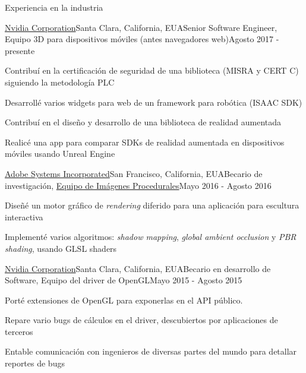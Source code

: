 \documentclass{resume} %
\begin{document}

\begin{rSection}{Experiencia en la industria}

\begin{rSubsection}{\href{http://www.nvidia.com}{Nvidia Corporation}}{Santa Clara, California, EUA}{Senior Software Engineer, Equipo 3D para dispositivos móviles (antes navegadores web)}{Agosto 2017 - presente}
\item Contribuí en la certificación de seguridad de una biblioteca (MISRA y CERT C) siguiendo la metodología PLC
\item Desarrollé varios widgets para web de un framework para robótica (ISAAC SDK)
\item Contribuí en el diseño y desarrollo de una biblioteca de realidad aumentada
\item Realicé una app para comparar SDKs de realidad aumentada en dispositivos móviles usando Unreal Engine
\end{rSubsection}

\begin{rSubsection}{\href{http://www.adobe.com/}{Adobe Systems Incorporated}}{San Francisco, California, EUA}{Becario de investigación, \href{http://research.adobe.com/}{Equipo de Imágenes Procedurales}}{Mayo 2016 - Agosto 2016}
\item Diseñé un motor gráfico de \emph{rendering} diferido para una aplicación para escultura interactiva
\item Implementé varios algoritmos: \emph{shadow mapping}, \emph{global ambient occlusion} y \emph{PBR shading}, usando GLSL shaders
\end{rSubsection}

\begin{rSubsection}{\href{http://www.nvidia.com}{Nvidia Corporation}}{Santa Clara, California, EUA}{Becario en desarrollo de Software, Equipo del driver de OpenGL}{Mayo 2015 - Agosto 2015}
\item Porté extensiones de OpenGL para exponerlas en el API público.
\item Repare vario bugs de cálculos en el driver, descubiertos por aplicaciones de terceros
\item Entable comunicación con ingenieros de diversas partes del mundo para detallar reportes de bugs
\end{rSubsection}


\end{rSection}
\end{document}
